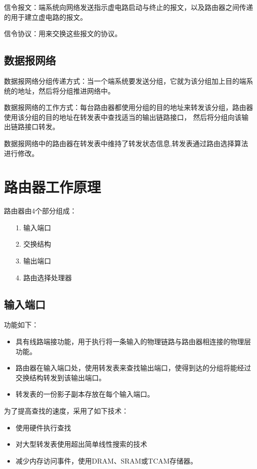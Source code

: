 \documentclass[a4paper,left=2.5cm,right=2.5cm,11pt]{article}
\begin{document}
	信令报文：端系统向网络发送指示虚电路启动与终止的报文，以及路由器之间传递的用于建立虚电路的报文。\par

	信令协议：用来交换这些报文的协议。

\subsection{数据报网络}
	数据报网络分组传递方式：当一个端系统要发送分组，它就为该分组加上目的端系统的地址，然后将分组推进网络中。\par

	数据报网络的工作方式：每台路由器都使用分组的目的地址来转发该分组，路由器使用该分组的目的地址在转发表中查找适当的输出链路接口，
	然后将分组向该输出链路接口转发。\par

	数据报网络中的路由器在转发表中维持了转发状态信息,转发表通过路由选择算法进行修改。

\section{路由器工作原理}
	路由器由4个部分组成：
	\begin{itemize}
		\item[1.] 输入端口
		\item[2.] 交换结构
		\item[3.] 输出端口
		\item[4.] 路由选择处理器
	\end{itemize}

\subsection{输入端口}
	功能如下：
	\begin{itemize}
		\item 具有线路端接功能，用于执行将一条输入的物理链路与路由器相连接的物理层功能。
		\item 路由器在输入端口处，使用转发表来查找输出端口，使得到达的分组将能经过交换结构转发到该输出端口。
		\item 转发表的一份影子副本存放在每个输入端口。
	\end{itemize}

	为了提高查找的速度，采用了如下技术：
	\begin{itemize}
		\item 使用硬件执行查找
		\item 对大型转发表使用超出简单线性搜索的技术
		\item 减少内存访问事件，使用DRAM、SRAM或TCAM存储器。
	\end{itemize}
\end{document}
